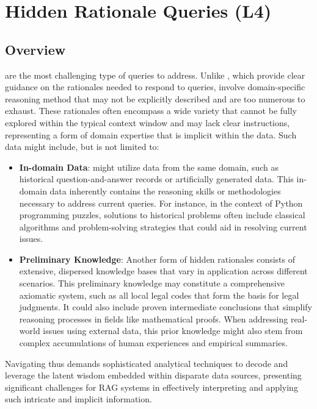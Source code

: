 \section{Hidden Rationale Queries (L4)}

\subsection{Overview}
\MFUsentencecase{\forthlevel} are the most challenging type of queries to address. Unlike \thirdlevel , which provide clear guidance on the rationales needed to respond to queries, \forthlevel involve domain-specific reasoning method that may not be explicitly described and are too numerous to exhaust. These rationales often encompass a wide variety that cannot be fully explored within the typical context window and may lack clear instructions, representing a form of domain expertise that is implicit within the data. Such data might include, but is not limited to:

\begin{itemize}
    \item \textbf{In-domain Data}: \MFUsentencecase{\forthlevel} might utilize data from the same domain, such as historical question-and-answer records or artificially generated data. This in-domain data inherently contains the reasoning skills or methodologies necessary to address current queries. For instance, in the context of Python programming puzzles, solutions to historical problems often include classical algorithms and problem-solving strategies that could aid in resolving current issues.
    \item \textbf{Preliminary Knowledge}: Another form of hidden rationales consists of extensive, dispersed knowledge bases that vary in application across different scenarios. This preliminary knowledge may constitute a comprehensive axiomatic system, such as all local legal codes that form the basis for legal judgments. It could also include proven intermediate conclusions that simplify reasoning processes in fields like mathematical proofs. When addressing real-world issues using external data, this prior knowledge might also stem from complex accumulations of human experiences and empirical summaries.
\end{itemize}

Navigating \forthlevel thus demands sophisticated analytical techniques to decode and leverage the latent wisdom embedded within disparate data sources, presenting significant challenges for RAG systems in effectively interpreting and applying such intricate and implicit information.

